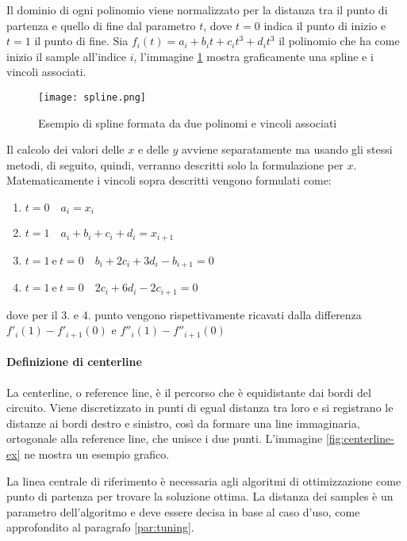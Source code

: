 Il dominio di ogni polinomio viene normalizzato per la distanza tra il punto di partenza e quello di fine
dal parametro $t$, dove $t = 0$ indica il punto di inizio e $t = 1$ il punto di fine.
Sia $f_i(t) = a_i + b_i t + c_i t^3 + d_i t^3$ il polinomio che ha come inizio il sample all'indice $i$,
l'immagine \ref{fig:spline} mostra graficamente una spline e i vincoli associati.

\begin{figure}
	\begin{center}
		\texttt{[image: spline.png]}
	\end{center}
	\caption{Esempio di spline formata da due polinomi e vincoli associati \cite{lection22}}
	\label{fig:spline}
\end{figure}
Il calcolo dei valori delle $x$ e delle $y$ avviene separatamente ma usando gli stessi metodi, di
seguito, quindi, verranno descritti solo la formulazione per $x$.
Matematicamente i vincoli sopra descritti vengono formulati come:
\begin{enumerate}
	\item $t = 0 \quad a_i = x_i$
	\item $t = 1 \quad a_i + b_i + c_i + d_i = x_{i+1}$
	\item $t = 1\ \text{e}\ t = 0 \quad b_i + 2 c_i + 3 d_i - b_{i+1} = 0$
	\item $t = 1\ \text{e}\ t = 0 \quad 2 c_i + 6 d_i - 2 c_{i+1} = 0$
\end{enumerate}
dove per il 3. e 4. punto vengono rispettivamente ricavati dalla differenza \\
$f'_i(1) - f'_{i+1}(0)$ e $f''_i(1) - f''_{i+1}(0)$


\paragraph{Definizione di centerline}
\label{par:centerline}
La centerline, o reference line, è il percorso che è equidistante dai bordi del circuito. Viene
discretizzato in punti di egual distanza tra loro e si registrano le distanze ai bordi destro e sinistro,
così da formare una line immaginaria, ortogonale alla reference line, che unisce i due punti. L'immagine
\ref{fig:centerline-ex} ne mostra un esempio grafico.

La linea centrale di riferimento è necessaria agli algoritmi di ottimizzazione come punto di partenza per
trovare la soluzione ottima.
La distanza dei samples è un parametro dell'algoritmo e deve essere decisa in base al caso d'uso, come
approfondito al paragrafo \ref{par:tuning}.

